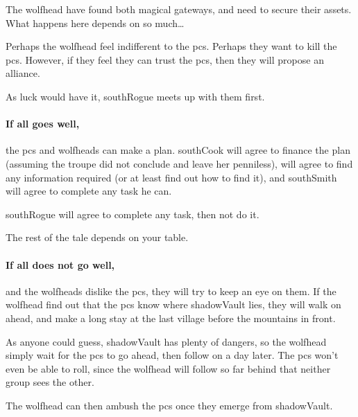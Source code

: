 The \gls{wolfhead} have found both magical gateways, and need to secure their assets.
What happens here depends on so much\ldots

Perhaps the \gls{wolfhead} feel indifferent to the \glspl{pc}.
Perhaps they want to kill the \glspl{pc}.
However, if they feel they can trust the \glspl{pc}, then they will propose an alliance.

As luck would have it, \gls{southRogue} meets up with them first.

\paragraph{If all goes well,}
the \glspl{pc} and \glspl{wolfhead} can make a plan.
\Gls{southCook} will agree to finance the plan (assuming the troupe did not conclude  and leave her penniless),  will agree to find any information required (or at least find out how to find it), and \gls{southSmith} will agree to complete any task he can.

\Gls{southRogue} will agree to complete any task, then not do it.

The rest of the tale depends on your table.

\paragraph{If all does not go well,}
and the \glspl{wolfhead} dislike the \glspl{pc}, they will try to keep an eye on them.
If the \gls{wolfhead} find out that the \glspl{pc} know where \gls{shadowVault} lies, they will walk on ahead, and make a long stay at the last \gls{village} before the mountains in front.

As anyone could guess, \gls{shadowVault} has plenty of dangers, so the \gls{wolfhead} simply wait for the \glspl{pc} to go ahead, then follow on a day later.
The \glspl{pc} won't even be able to roll, since the \gls{wolfhead} will follow so far behind that neither group sees the other.

The \gls{wolfhead} can then ambush the \glspl{pc} once they emerge from \gls{shadowVault}.

